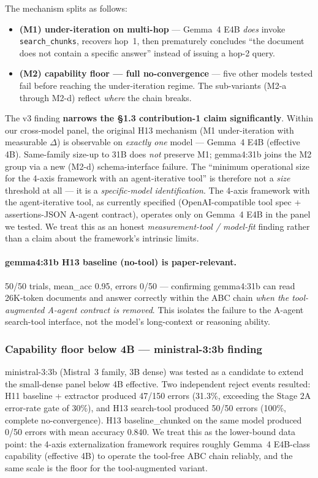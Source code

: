 \documentclass[11pt]{article}
\newcommand{\code}[1]{\texttt{#1}}
\begin{document}
The mechanism splits as follows:

\begin{itemize}[leftmargin=*]
\item \textbf{(M1) under-iteration on multi-hop} --- Gemma~4 E4B \emph{does} invoke \code{search\_chunks}, recovers hop~1, then prematurely concludes ``the document does not contain a specific answer'' instead of issuing a hop-2 query.
\item \textbf{(M2) capability floor --- full no-convergence} --- five other models tested fail before reaching the under-iteration regime. The sub-variants (M2-a through M2-d) reflect \emph{where} the chain breaks.
\end{itemize}

The v3 finding \textbf{narrows the \S1.3 contribution-1 claim significantly}. Within our cross-model panel, the original H13 mechanism (M1 under-iteration with measurable $\Delta$) is observable on \emph{exactly one} model --- Gemma~4 E4B (effective 4B). Same-family size-up to 31B does \emph{not} preserve M1; gemma4:31b joins the M2 group via a new (M2-d) schema-interface failure. The ``minimum operational size for the 4-axis framework with an agent-iterative tool'' is therefore not a \emph{size} threshold at all --- it is a \emph{specific-model identification}. The 4-axis framework with the agent-iterative tool, as currently specified (OpenAI-compatible tool spec + assertions-JSON A-agent contract), operates only on Gemma~4 E4B in the panel we tested. We treat this as an honest \emph{measurement-tool / model-fit} finding rather than a claim about the framework's intrinsic limits.

\paragraph{gemma4:31b H13 baseline (no-tool) is paper-relevant.}
50/50 trials, mean\_acc 0.95, errors 0/50 --- confirming gemma4:31b can read 26K-token documents and answer correctly within the ABC chain \emph{when the tool-augmented A-agent contract is removed}. This isolates the failure to the A-agent search-tool interface, not the model's long-context or reasoning ability.

\subsubsection{Capability floor below 4B --- ministral-3:3b finding}\label{sec:floor}
ministral-3:3b (Mistral~3 family, 3B dense) was tested as a candidate to extend the small-dense panel below 4B effective. Two independent reject events resulted: H11 baseline + extractor produced 47/150 errors (31.3\%, exceeding the Stage 2A error-rate gate of 30\%), and H13 search-tool produced 50/50 errors (100\%, complete no-convergence). H13 baseline\_chunked on the same model produced 0/50 errors with mean accuracy 0.840. We treat this as the lower-bound data point: the 4-axis externalization framework requires roughly Gemma~4 E4B-class capability (effective 4B) to operate the tool-free ABC chain reliably, and the same scale is the floor for the tool-augmented variant.
\end{document}
